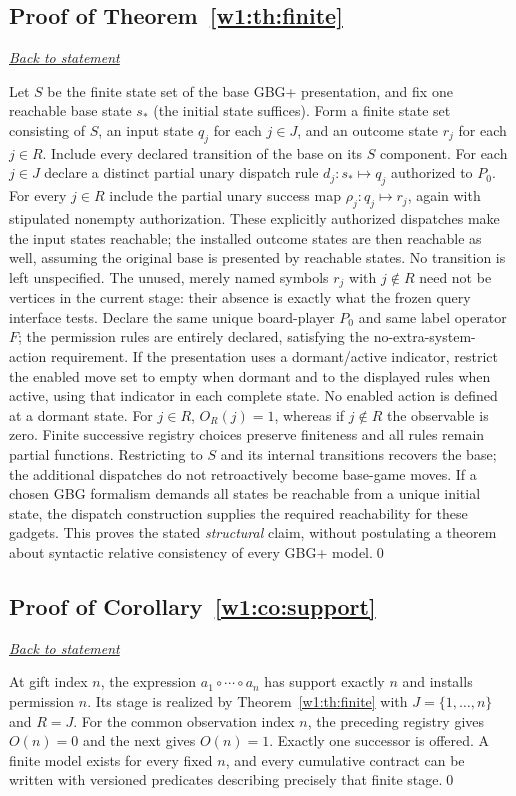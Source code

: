 \documentclass[11pt,letterpaper]{article}
\theoremstyle{definition}\newtheorem{definition}[theorem]{Definition}\newtheorem{example}[theorem]{Example}
\theoremstyle{remark}\newtheorem{remark}[theorem]{Remark}
\newcommand{\backlink}[1]{\noindent\hyperref[#1]{\textit{Back to statement}}\par\smallskip}
\begin{document}
\subsection{Proof of Theorem~\ref{w1:th:finite}}\label{w1:pr:finite}\backlink{w1:th:finite}
Let $S$ be the finite state set of the base GBG+ presentation, and fix one reachable base state $s_*$ (the initial state suffices). Form a finite state set consisting of $S$, an input state $q_j$ for each $j\in J$, and an outcome state $r_j$ for each $j\in R$. Include every declared transition of the base on its $S$ component. For each $j\in J$ declare a distinct partial unary dispatch rule $d_j:s_*\mapsto q_j$ authorized to $P_0$. For every $j\in R$ include the partial unary success map $\rho_j:q_j\mapsto r_j$, again with stipulated nonempty authorization. These explicitly authorized dispatches make the input states reachable; the installed outcome states are then reachable as well, assuming the original base is presented by reachable states. No transition is left unspecified. The unused, merely named symbols $r_j$ with $j\notin R$ need not be vertices in the current stage: their absence is exactly what the frozen query interface tests. Declare the same unique board-player $P_0$ and same label operator $F$; the permission rules are entirely declared, satisfying the no-extra-system-action requirement. If the presentation uses a dormant/active indicator, restrict the enabled move set to empty when dormant and to the displayed rules when active, using that indicator in each complete state. No enabled action is defined at a dormant state. For $j\in R$, $O_R(j)=1$, whereas if $j\notin R$ the observable is zero. Finite successive registry choices preserve finiteness and all rules remain partial functions. Restricting to $S$ and its internal transitions recovers the base; the additional dispatches do not retroactively become base-game moves. If a chosen GBG formalism demands all states be reachable from a unique initial state, the dispatch construction supplies the required reachability for these gadgets. This proves the stated \emph{structural} claim, without postulating a theorem about syntactic relative consistency of every GBG+ model.\qed

\subsection{Proof of Corollary~\ref{w1:co:support}}\label{w1:pr:support}\backlink{w1:co:support}
At gift index $n$, the expression $a_1\circ\cdots\circ a_n$ has support exactly $n$ and installs permission $n$. Its stage is realized by Theorem~\ref{w1:th:finite} with $J=\{1,\dots,n\}$ and $R=J$. For the common observation index $n$, the preceding registry gives $O(n)=0$ and the next gives $O(n)=1$. Exactly one successor is offered. A finite model exists for every fixed $n$, and every cumulative contract can be written with versioned predicates describing precisely that finite stage.\qed
\end{document}
